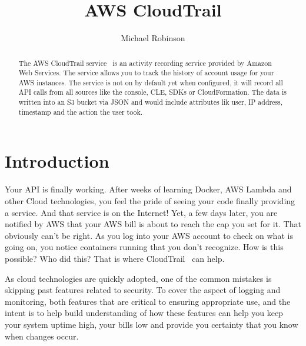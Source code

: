 
\title{AWS CloudTrail}

\author{Michael Robinson}


\renewcommand{\shortauthors}{M. Robinson}


\begin{abstract}
The AWS CloudTrail service~\cite{hid-sp18-518-CloudTrail} is an activity 
recording service provided by Amazon Web Services. The service allows you to 
track the history of account usage for your AWS instances. The service is not 
on by default yet when configured, it will record all API calls from all 
sources like the console, CLE, SDKs or CloudFormation. The data is written 
into an S3 bucket via JSON and would include attributes lik user, IP address, 
timestamp and the action the user took.
\end{abstract}


\maketitle

\section{Introduction}

Your API is finally working. After weeks of learning Docker, AWS Lambda and 
other Cloud technologies, you feel the pride of seeing your code finally 
providing a service. And that service is on the Internet! Yet, a few days 
later, you are notified by AWS that your AWS bill is about to reach the cap 
you set for it. That obviously can’t be right. As you log into your AWS 
account to check on what is going on, you notice containers running that you 
don’t recognize. How is this possible? Who did this? That is where 
CloudTrail~\cite{hid-sp18-518-CloudTrail} can help.

As cloud technologies are quickly adopted, one of the common mistakes is 
skipping past features related to security. To cover the aspect of
logging and monitoring, both features that are critical to ensuring 
appropriate use, and the intent is to help build understanding of how these 
features can help you keep your system uptime high, your bills low and provide 
you certainty that you know when changes occur.

